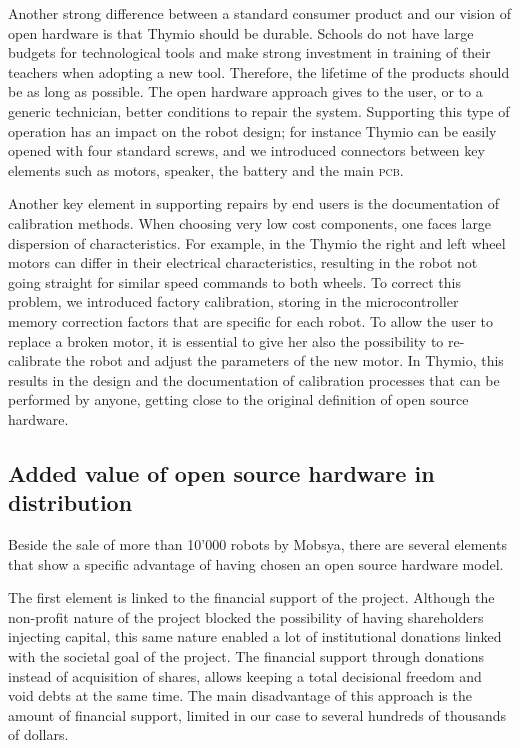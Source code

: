 \documentclass[letterpaper, 10 pt, conference]{ieeeconf}  %
\begin{document}
Another strong difference between a standard consumer product and our vision of open hardware is that Thymio should be durable.
Schools do not have large budgets for technological tools and make strong investment in training of their teachers when adopting a new tool.
Therefore, the lifetime of the products should be as long as possible. 
The open hardware approach gives to the user, or to a generic technician, better conditions to repair the system.
Supporting this type of operation has an impact on the robot design; for instance Thymio can be easily opened with four standard screws, and we introduced connectors between key elements such as motors, speaker, the battery and the main \textsc{pcb}.

Another key element in supporting repairs by end users is the documentation of calibration methods. 
When choosing very low cost components, one faces large dispersion of characteristics. 
For example, in the Thymio the right and left wheel motors can differ in their electrical characteristics, resulting in the robot not going straight for similar speed commands to both wheels.
To correct this problem, we introduced factory calibration, storing in the microcontroller memory correction factors that are specific for each robot. 
To allow the user to replace a broken motor, it is essential to give her also the possibility to re-calibrate the robot and adjust the parameters of the new motor.
In Thymio, this results in the design and the documentation of calibration processes that can be performed by anyone, getting close to the original definition of open source hardware.

\subsection{Added value of open source hardware in distribution}

Beside the sale of more than 10'000 robots by Mobsya, there are several elements that show a specific advantage of having chosen an open source hardware model.

The first element is linked to the financial support of the project.
Although the non-profit nature of the project blocked the possibility of having shareholders injecting capital, this same nature enabled a lot of institutional donations linked with the societal goal of the project.
The financial support through donations instead of acquisition of shares, allows keeping a total decisional freedom and void debts at the same time.
The main disadvantage of this approach is the amount of financial support, limited in our case to several hundreds of thousands of dollars. 
\end{document}
